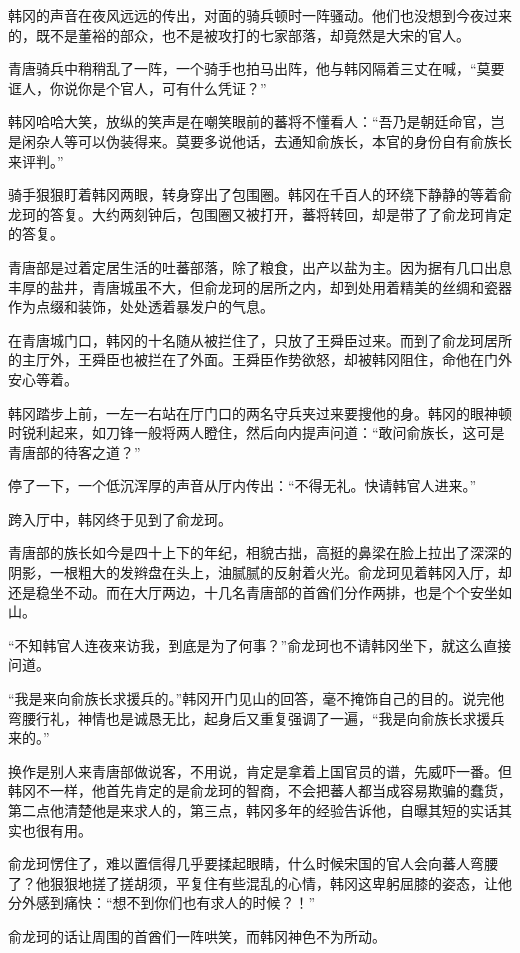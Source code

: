 韩冈的声音在夜风远远的传出，对面的骑兵顿时一阵骚动。他们也没想到今夜过来的，既不是董裕的部众，也不是被攻打的七家部落，却竟然是大宋的官人。

青唐骑兵中稍稍乱了一阵，一个骑手也拍马出阵，他与韩冈隔着三丈在喊，“莫要诓人，你说你是个官人，可有什么凭证？”

韩冈哈哈大笑，放纵的笑声是在嘲笑眼前的蕃将不懂看人：“吾乃是朝廷命官，岂是闲杂人等可以伪装得来。莫要多说他话，去通知俞族长，本官的身份自有俞族长来评判。”

骑手狠狠盯着韩冈两眼，转身穿出了包围圈。韩冈在千百人的环绕下静静的等着俞龙珂的答复。大约两刻钟后，包围圈又被打开，蕃将转回，却是带了了俞龙珂肯定的答复。

青唐部是过着定居生活的吐蕃部落，除了粮食，出产以盐为主。因为据有几口出息丰厚的盐井，青唐城虽不大，但俞龙珂的居所之内，却到处用着精美的丝绸和瓷器作为点缀和装饰，处处透着暴发户的气息。

在青唐城门口，韩冈的十名随从被拦住了，只放了王舜臣过来。而到了俞龙珂居所的主厅外，王舜臣也被拦在了外面。王舜臣作势欲怒，却被韩冈阻住，命他在门外安心等着。

韩冈踏步上前，一左一右站在厅门口的两名守兵夹过来要搜他的身。韩冈的眼神顿时锐利起来，如刀锋一般将两人瞪住，然后向内提声问道：“敢问俞族长，这可是青唐部的待客之道？”

停了一下，一个低沉浑厚的声音从厅内传出：“不得无礼。快请韩官人进来。”

跨入厅中，韩冈终于见到了俞龙珂。

青唐部的族长如今是四十上下的年纪，相貌古拙，高挺的鼻梁在脸上拉出了深深的阴影，一根粗大的发辫盘在头上，油腻腻的反射着火光。俞龙珂见着韩冈入厅，却还是稳坐不动。而在大厅两边，十几名青唐部的首酋们分作两排，也是个个安坐如山。

“不知韩官人连夜来访我，到底是为了何事？”俞龙珂也不请韩冈坐下，就这么直接问道。

“我是来向俞族长求援兵的。”韩冈开门见山的回答，毫不掩饰自己的目的。说完他弯腰行礼，神情也是诚恳无比，起身后又重复强调了一遍，“我是向俞族长求援兵来的。”

换作是别人来青唐部做说客，不用说，肯定是拿着上国官员的谱，先威吓一番。但韩冈不一样，他首先肯定的是俞龙珂的智商，不会把蕃人都当成容易欺骗的蠢货，第二点他清楚他是来求人的，第三点，韩冈多年的经验告诉他，自曝其短的实话其实也很有用。

俞龙珂愣住了，难以置信得几乎要揉起眼睛，什么时候宋国的官人会向蕃人弯腰了？他狠狠地搓了搓胡须，平复住有些混乱的心情，韩冈这卑躬屈膝的姿态，让他分外感到痛快：“想不到你们也有求人的时候？！”

俞龙珂的话让周围的首酋们一阵哄笑，而韩冈神色不为所动。


